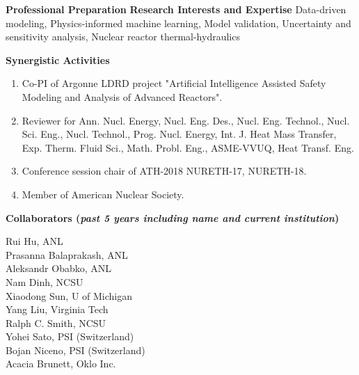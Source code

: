 \documentclass[11pt,letterpaper,english]{article}
\begin{document}
\begin{flushleft} {\bf Professional Preparation}
\vspace{-6pt}
{\bf Research Interests and Expertise}
{\parindent 16pt
Data-driven modeling, Physics-informed machine learning, Model validation, Uncertainty and sensitivity analysis, Nuclear reactor thermal-hydraulics
}

\vspace{.04in}
{\bf Synergistic Activities}
\vspace{-6pt}
\begin{enumerate} \itemsep1pt \parskip0pt 
\item Co-PI of Argonne LDRD project "Artificial Intelligence Assisted Safety Modeling and Analysis of Advanced Reactors".
\item Reviewer for Ann. Nucl. Energy, Nucl. Eng. Des., Nucl. Eng. Technol., Nucl. Sci. Eng., Nucl. Technol.,
Prog. Nucl. Energy, Int. J. Heat Mass Transfer, Exp. Therm. Fluid Sci., Math. Probl. Eng., ASME-VVUQ, Heat Transf. Eng.
\item Conference session chair of ATH-2018 NURETH-17, NURETH-18.
\item Member of American Nuclear Society.
\end{enumerate}

\vspace{-6pt}
{\bf Collaborators ({\emph{past 5 years including name and current institution}})}
{\parindent 16pt

Rui Hu, ANL \\
Prasanna Balaprakash, ANL\\
Aleksandr Obabko, ANL\\
Nam Dinh, NCSU \\
Xiaodong Sun, U of Michigan \\
Yang Liu, Virginia Tech\\
Ralph C. Smith, NCSU\\
Yohei Sato, PSI (Switzerland)\\
Bojan Niceno, PSI (Switzerland)\\
Acacia Brunett, Oklo Inc.\\
}
\end{flushleft}
\end{document}
